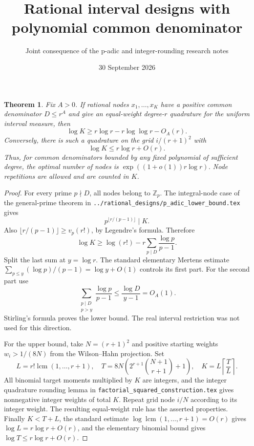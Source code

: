 \documentclass[11pt]{article}
\title{Rational interval designs with polynomial common denominator}
\author{Joint consequence of the p-adic and integer-rounding research notes}
\date{30 September 2026}
\newtheorem{theorem}{Theorem}
\begin{document}
\maketitle

\begin{theorem}
Fix $A>0$. If rational nodes $x_1,\ldots,x_K$ have a positive common
denominator $D\le r^A$ and give an equal-weight degree-$r$ quadrature
for the uniform interval measure, then
\[
 \log K\ge r\log r-r\log\log r-O_A(r).
\]
Conversely, there is such a quadrature on the grid
$i/(r+1)^2$ with
\[
 \log K\le r\log r+O(r).
\]
Thus, for common denominators bounded by any fixed polynomial of sufficient
degree, the optimal number of nodes is $\exp((1+o(1))r\log r)$.
Node repetitions are allowed and are counted in $K$.
\end{theorem}
\begin{proof}
For every prime $p\nmid D$, all nodes belong to $\mathbb Z_p$.
The integral-node case of the general-prime theorem in
\texttt{../rational\_designs/p\_adic\_lower\_bound.tex} gives
\[
 p^{\lfloor r/(p-1)\rfloor}\mid K.
\]
Also $\lfloor r/(p-1)\rfloor\ge v_p(r!)$, by Legendre's formula.
Therefore
\[
 \log K\ge\log(r!)-r\sum_{p\mid D}\frac{\log p}{p-1}.
\]
Split the last sum at $y=\log r$. The standard elementary Mertens estimate
$\sum_{p\le y}(\log p)/(p-1)=\log y+O(1)$ controls its first part.
For the second part use
\[
 \sum_{\substack{p\mid D\\p>y}}\frac{\log p}{p-1}
 \le\frac{\log D}{y-1}=O_A(1).
\]
Stirling's formula proves the lower bound. The real interval restriction
was not used for this direction.

For the upper bound, take $N=(r+1)^2$ and positive starting weights
$w_i>1/(8N)$ from the Wilson--Hahn projection. Set
\[
 L=r!\operatorname{lcm}(1,\ldots,r+1),\quad
 T=8N\left(2^{r+1}\binom{N+1}{r+1}+1\right),\quad
 K=L\left\lceil\frac{T}{L}\right\rceil.
\]
All binomial target moments multiplied by $K$ are integers, and the
integer quadrature rounding lemma in
\texttt{factorial\_squared\_construction.tex} gives nonnegative integer
weights of total $K$. Repeat grid node $i/N$ according to its integer
weight. The resulting equal-weight rule has the asserted properties.
Finally $K<T+L$, the standard estimate
$\log\operatorname{lcm}(1,\ldots,r+1)=O(r)$ gives
$\log L=r\log r+O(r)$, and the elementary binomial bound gives
$\log T\le r\log r+O(r)$.
\end{proof}
\end{document}
